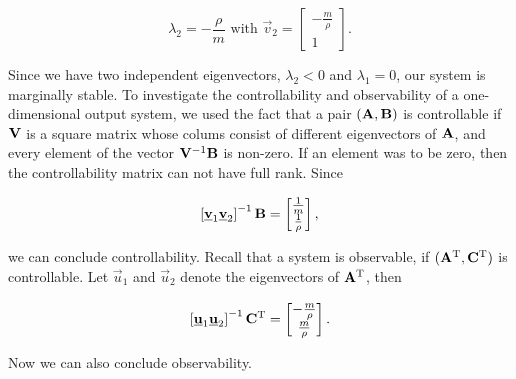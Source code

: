 \documentclass[11pt,titlepage]{report}
\begin{document}
\begin{equation}
	\lambda_2 = -\frac{\rho}{m}\text{ with }
	\vec{v}_2 = \begin{bmatrix}
		-\frac{m}{\rho} \\
		1
	\end{bmatrix}.
\end{equation}

Since we have two independent eigenvectors, $\lambda_2 < 0$ and $\lambda_1 = 0$, our system is marginally stable. To investigate the controllability and observability of a one-dimensional output system, we used the fact that a pair $(\mathbf{A},\mathbf{B})$ is controllable if $\mathbf{V}$ is a square matrix whose colums consist of different eigenvectors of $\mathbf{A}$, and every element of the vector $\mathbf{V}^{-1} \mathbf{B}$ is non-zero. If an element was to be zero, then the controllability matrix can not have full rank. Since

\begin{equation}
	\left[\mathbf{\underline{v}}_1 \mathbf{\underline{v}}_2 \right]^{-1} \mathbf{B} = \begin{bmatrix}
		\frac{1}{m} \\
		\frac{1}{\rho}
	\end{bmatrix},
\end{equation}

we can conclude controllability. Recall that a system is observable, if $(\mathbf{A}^{\text T},\mathbf{C}^{\text T})$ is controllable. Let $\vec{u}_1$ and $\vec{u}_2$ denote the eigenvectors of $\mathbf{A}^{\text T}$, then

\begin{equation}
	\left[\mathbf{\underline{u}}_1 \mathbf{\underline{u}}_2 \right]^{-1} \mathbf{C}^{\text T} = \begin{bmatrix}
		-\frac{m}{\rho} \\
		\frac{m}{\rho}
	\end{bmatrix}.
\end{equation}

Now we can also conclude observability.
\end{document}
